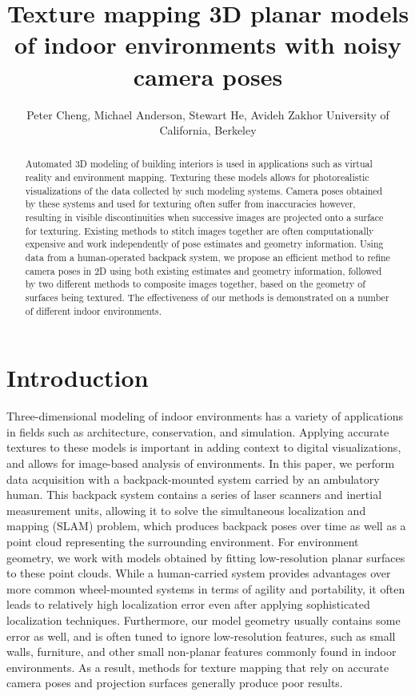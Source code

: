 \documentclass[]{spie}  %
\title{Texture mapping 3D planar models of indoor environments with noisy camera poses}
\author{Peter Cheng, Michael Anderson, Stewart He, Avideh Zakhor
\skiplinehalf
University of California, Berkeley\\
}
\begin{document}
\maketitle

\begin{abstract}
  Automated 3D modeling of building interiors is used in applications
  such as virtual reality and environment mapping. Texturing these
  models allows for photorealistic visualizations of the data
  collected by such modeling systems. Camera poses obtained by these
  systems and used for texturing often suffer from inaccuracies
  however, resulting in visible discontinuities when successive images
  are projected onto a surface for texturing. Existing methods to
  stitch images together are often computationally expensive and work
  independently of pose estimates and geometry information. Using data
  from a human-operated backpack system, we propose an efficient
  method to refine camera poses in 2D using both existing estimates
  and geometry information, followed by two different methods to
  composite images together, based on the geometry of surfaces being
  textured. The effectiveness of our methods is demonstrated on a
  number of different indoor environments.
\end{abstract}



\section{Introduction}
\label{sec:introduction}
Three-dimensional modeling of indoor environments has a variety of
applications in fields such as architecture, conservation, and
simulation. Applying accurate textures to these models is important in
adding context to digital visualizations, and allows for image-based
analysis of environments. In this paper, we perform data acquisition
with a backpack-mounted system carried by an ambulatory human. This
backpack system contains a series of laser scanners and inertial
measurement units, allowing it to solve the simultaneous localization
and mapping (SLAM) problem, which produces backpack poses over time as
well as a point cloud representing the surrounding environment. For
environment geometry, we work with models obtained by fitting
low-resolution planar surfaces to these point clouds.  While a
human-carried system provides advantages over more common
wheel-mounted systems in terms of agility and portability, it often
leads to relatively high localization error even after applying
sophisticated localization techniques. Furthermore, our model geometry
usually contains some error as well, and is often tuned to ignore
low-resolution features, such as small walls, furniture, and other
small non-planar features commonly found in indoor environments. As a
result, methods for texture mapping that rely on accurate camera poses
and projection surfaces generally produce poor results.
\end{document}
